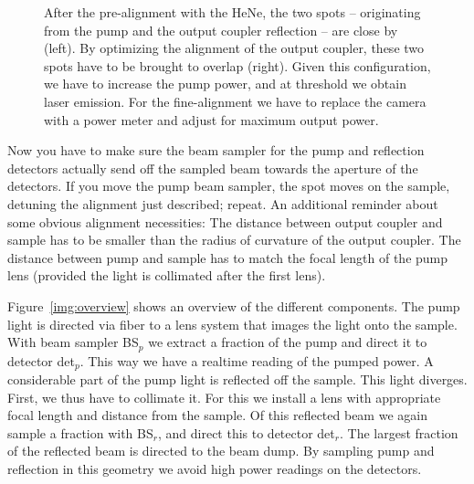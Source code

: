 \begin{figure}
\centering
{}
\caption{After the pre-alignment
with the HeNe,
the two spots --
originating
from the pump
and the output coupler reflection --
are close by (left).
By optimizing the alignment
of the output coupler,
these two spots
have to be brought to overlap (right).
Given this configuration,
we have to increase the pump power,
and at threshold we obtain laser emission.
For the fine-alignment
we have to replace the camera
with a power meter
and adjust for maximum output power.}
\label{img:spot_overlap}
\end{figure}

Now you have to make sure
the beam sampler
for the pump and reflection detectors
actually send off
the sampled beam
towards the aperture
of the detectors.
If you move the pump beam sampler,
the spot moves
on the sample,
detuning the alignment
just described;
repeat.
An additional reminder
about some obvious alignment necessities:
The distance between
output coupler and sample
has to be smaller than
the radius of curvature
of the output coupler.
The distance between
pump and sample
has to match
the focal length
of the pump lens
(provided the light is collimated
after the first lens).

Figure~\ref{img:overview} shows an overview of the different components.
The pump light is directed via fiber to a lens system that images the light onto the sample.
With beam sampler BS$_p$ we extract a fraction of the pump and direct it to detector det$_p$.
This way we have a realtime reading of the pumped power.
A considerable part of the pump light is reflected off the sample.
This light diverges.
First, we thus have to collimate it.
For this we install a lens with appropriate focal length and distance from the sample.
Of this reflected beam we again sample a fraction with BS$_r$,
and direct this to detector det$_r$.
The largest fraction of the reflected beam is directed to the beam dump.
By sampling pump and reflection in this geometry
we avoid high power readings on the detectors.

